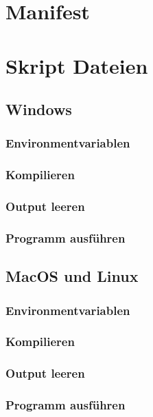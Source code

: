 \section{Manifest}

\clearpage
%
\section{Skript Dateien}
\subsection{Windows}
\subsubsection{Environmentvariablen}

\clearpage
%
\subsubsection{Kompilieren}

\clearpage
%
\subsubsection{Output leeren}

\clearpage
%
\subsubsection{Programm ausführen}

\clearpage
%
\subsection{MacOS und Linux}
\subsubsection{Environmentvariablen}
%
\clearpage
%
\subsubsection{Kompilieren}

\clearpage
%
\subsubsection{Output leeren}

\clearpage
%
\subsubsection{Programm ausführen}

\cleardoublepage